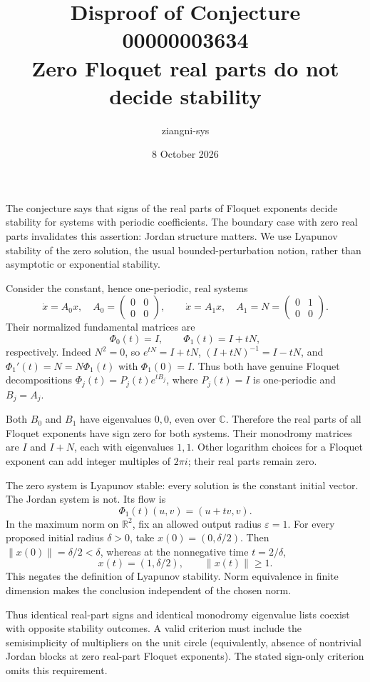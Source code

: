 \documentclass[11pt]{article}
\title{Disproof of Conjecture 00000003634\\Zero Floquet real parts do not decide stability}
\author{ziangni-sys}
\date{8 October 2026}
\begin{document}
\maketitle
The conjecture says that signs of the real parts of Floquet exponents decide stability for systems with periodic coefficients. The boundary case with zero real parts invalidates this assertion: Jordan structure matters. We use Lyapunov stability of the zero solution, the usual bounded-perturbation notion, rather than asymptotic or exponential stability.

Consider the constant, hence one-periodic, real systems
\[
 \dot x=A_0x,\quad A_0=\begin{pmatrix}0&0\\0&0\end{pmatrix},
 \qquad \dot x=A_1x,\quad A_1=N=\begin{pmatrix}0&1\\0&0\end{pmatrix}.
\]
Their normalized fundamental matrices are
\[
 \Phi_0(t)=I,\qquad \Phi_1(t)=I+tN,
\]
respectively. Indeed $N^2=0$, so $e^{tN}=I+tN$, $(I+tN)^{-1}=I-tN$, and
$\Phi_1'(t)=N=N\Phi_1(t)$ with $\Phi_1(0)=I$. Thus both have genuine Floquet decompositions
$\Phi_j(t)=P_j(t)e^{tB_j}$, where $P_j(t)=I$ is one-periodic and $B_j=A_j$.

Both $B_0$ and $B_1$ have eigenvalues $0,0$, even over $\mathbb C$. Therefore the real parts of all Floquet exponents have sign zero for both systems. Their monodromy matrices are $I$ and $I+N$, each with eigenvalues $1,1$. Other logarithm choices for a Floquet exponent can add integer multiples of $2\pi i$; their real parts remain zero.

The zero system is Lyapunov stable: every solution is the constant initial vector. The Jordan system is not. Its flow is
\[
 \Phi_1(t)(u,v)=(u+tv,v).
\]
In the maximum norm on $\mathbb R^2$, fix an allowed output radius $\varepsilon=1$. For every proposed initial radius $\delta>0$, take $x(0)=(0,\delta/2)$. Then $\|x(0)\|=\delta/2<\delta$, whereas at the nonnegative time $t=2/\delta$,
\[
 x(t)=(1,\delta/2),\qquad \|x(t)\|\ge1.
\]
This negates the definition of Lyapunov stability. Norm equivalence in finite dimension makes the conclusion independent of the chosen norm.

Thus identical real-part signs and identical monodromy eigenvalue lists coexist with opposite stability outcomes. A valid criterion must include the semisimplicity of multipliers on the unit circle (equivalently, absence of nontrivial Jordan blocks at zero real-part Floquet exponents). The stated sign-only criterion omits this requirement.
\end{document}
